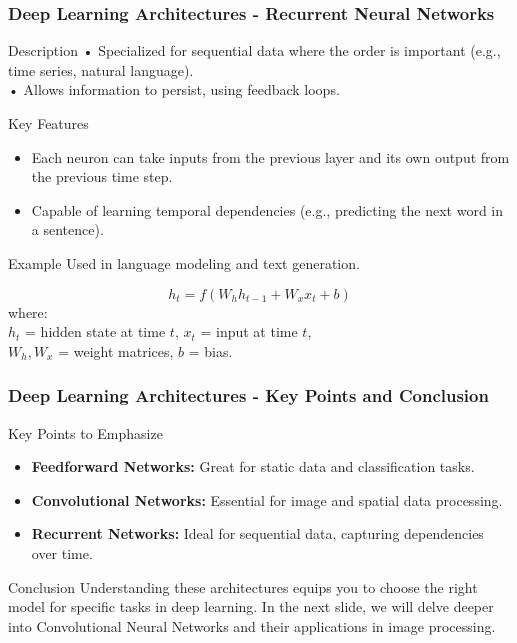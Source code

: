 \documentclass[aspectratio=169]{beamer}
\begin{document}
\begin{frame}[fragile]
    \frametitle{Deep Learning Architectures - Recurrent Neural Networks}
    
    \begin{block}{Description}
        • Specialized for sequential data where the order is important (e.g., time series, natural language). \\
        • Allows information to persist, using feedback loops.
    \end{block}
    
    \begin{block}{Key Features}
        \begin{itemize}
            \item Each neuron can take inputs from the previous layer and its own output from the previous time step.
            \item Capable of learning temporal dependencies (e.g., predicting the next word in a sentence).
        \end{itemize}
    \end{block}
    
    \begin{block}{Example}
        Used in language modeling and text generation.
    \end{block}
    
    \begin{equation}
        h_t = f(W_h h_{t-1} + W_x x_t + b)
    \end{equation}
    where: \\
    \( h_t \) = hidden state at time \( t \), \( x_t \) = input at time \( t \), \\ 
    \( W_h, W_x \) = weight matrices, \( b \) = bias.
\end{frame}

\begin{frame}[fragile]
    \frametitle{Deep Learning Architectures - Key Points and Conclusion}
    
    \begin{block}{Key Points to Emphasize}
        \begin{itemize}
            \item \textbf{Feedforward Networks:} Great for static data and classification tasks.
            \item \textbf{Convolutional Networks:} Essential for image and spatial data processing.
            \item \textbf{Recurrent Networks:} Ideal for sequential data, capturing dependencies over time.
        \end{itemize}
    \end{block}
    
    \begin{block}{Conclusion}
        Understanding these architectures equips you to choose the right model for specific tasks in deep learning. 
        In the next slide, we will delve deeper into Convolutional Neural Networks and their applications in image processing.
    \end{block}
\end{frame}
\end{document}
